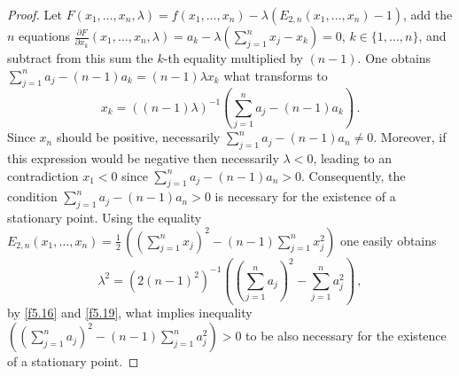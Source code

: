 \documentclass{amsart}
\begin{document}
\begin{proof}
Let $F(x_1,\ldots,x_n,\lambda) = f(x_1,\ldots,x_n) - \lambda (E_{2,n}(x_1,\ldots,x_n)-1)$, add the $n$ equations $\frac{{\partial} F}{{\partial} x_k} (x_1,\ldots,x_n,\lambda) = a_k-\lambda (\sum_{j=1}^n x_j - x_k)=0$, $k \in \{ 1,\ldots,n \}$, and subtract from this sum the $k$-th equality multiplied by $(n-1)$. One obtains $\sum_{j=1}^n a_j - (n-1)a_k = (n-1) \lambda x_k$ what transforms to
\begin{equation}   \label{f5.19}
    x_k = ((n-1)\lambda)^{-1} \left(\sum_{j=1}^n a_j - (n-1)a_k \right) \, .
\end{equation}
Since $x_n$ should be positive, necessarily $\sum_{j=1}^n a_j - (n-1)a_n \not= 0$. Moreover, if this expression would be negative then necessarily $\lambda < 0$, leading to an contradiction $x_1 <0$ since  $\sum_{j=1}^n a_j - (n-1)a_n > 0$. Consequently, the condition 
$\sum_{j=1}^n a_j - (n-1)a_n  > 0$ is necessary for the existence of a stationary point.  Using the equality $E_{2,n} (x_1,\ldots,x_n) = \frac{1}{2} \, \left((\sum_{j=1}^n x_j)^2 - (n-1) \sum_{j=1}^n x_j^2 \right)$ one easily obtains
\begin{equation}   \label{f5.20_1}
    \lambda^2 =(2 (n-1)^2)^{-1} \left((\sum_{j=1}^n a_j)^2 - \sum_{j=1}^n a_j^2 \right) \, ,
\end{equation}
by \eqref{f5.16} and \eqref{f5.19}, what implies inequality $\left((\sum_{j=1}^n a_j)^2 - (n-1) \sum_{j=1}^n a_j^2\right) > 0$ to be also necessary for the existence of a stationary point.


\end{proof}
\end{document}
